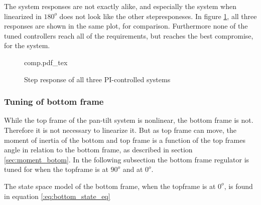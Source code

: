 \documentclass[../../../Main]{subfiles}
\begin{document}
The system responses are not exactly alike, and especially the system when linearized in $180^o$ does not look like the other stepresponeses. In figure \ref{fig:comp}, all three responses are shown in the same plot, for comparison. Furthermore none of the tuned controllers reach all of the requirements, but reaches the best compromise, for the system.

\begin{figure}[H]
\centering
\def\svgwidth{\textwidth}
{comp.pdf_tex}
\caption{Step response of all three PI-controlled systems}
\label{fig:comp}
\end{figure}

\subsubsection{Tuning of bottom frame}

While the top frame of the pan-tilt system is nonlinear, the bottom frame is not. Therefore it is not necessary to linearize it. But as top frame can move, the moment of inertia of the bottom and top frame is a function of the top frames angle in relation to the bottom frame, as described in section \ref{sec:moment_botom}. 
In the following subsection the bottom frame regulator is tuned for when the topframe is at $90^o$ and at $0^o$.

The state space model of the bottom frame, when the topframe is at $0^o$, is found in equation \eqref{:eq:bottom_state_eq}
\end{document}
